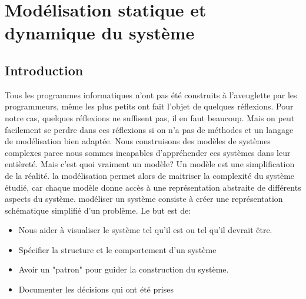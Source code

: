 \chapter{Modélisation statique et dynamique du système}
\minitoc
\newpage
\section{Introduction}
Tous les programmes informatiques n’ont pas été construits à l’aveuglette par les
programmeurs, même les plus petits ont fait l’objet de quelques réflexions. Pour notre cas,
quelques réflexions ne suffisent pas, il en faut beaucoup. Mais on peut facilement se perdre
dans ces réflexions si on n’a pas de méthodes et un langage de modélisation bien adaptée. Nous construisons des modèles de systèmes complexes parce nous sommes incapables d'appréhender ces systèmes dans leur entièreté.
 Mais c'est quoi vraiment  un modèle?
\medskip
	  Un modèle est une simplification de
	  la réalité. la modélisation permet alors de maitriser
	  la complexité du système étudié,
	  car chaque modèle donne accès à
	  une représentation abstraite de
	  différents aspects du système.
	modéliser un système   consiste à créer une représentation schématique simplifié d'un problème. Le but est de:
	\begin{itemize}
\item Nous aider à visualiser le système tel qu'il est ou tel qu'il devrait être.
\item Spécifier la structure et le comportement d'un système
\item Avoir un "patron" pour guider la construction du système.
\item Documenter les décisions qui ont été prises
	\end{itemize}
	

	
	
	
	
	
	
	
	
	
	
	
	
	
	
